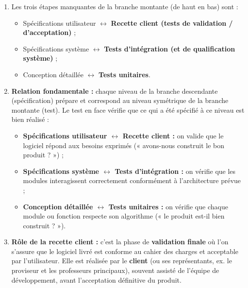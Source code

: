 \documentclass[11pt]{article}
\begin{document}
\begin{corrige}
\begin{enumerate}
    \item Les trois étapes manquantes de la branche montante (de haut en bas) sont :
    \begin{itemize}
        \item Spécifications utilisateur $\leftrightarrow$ \textbf{Recette client (tests de validation / d'acceptation)} ;
        \item Spécifications système $\leftrightarrow$ \textbf{Tests d'intégration (et de qualification système)} ;
        \item Conception détaillée $\leftrightarrow$ \textbf{Tests unitaires}.
    \end{itemize}
    \item \textbf{Relation fondamentale :} chaque niveau de la branche descendante (spécification) prépare et correspond au niveau symétrique de la branche montante (test). Le test en face vérifie que ce qui a été spécifié à ce niveau est bien réalisé :
    \begin{itemize}
        \item \textbf{Spécifications utilisateur $\leftrightarrow$ Recette client :} on valide que le logiciel répond aux besoins exprimés (« avons-nous construit le bon produit ? ») ;
        \item \textbf{Spécifications système $\leftrightarrow$ Tests d'intégration :} on vérifie que les modules interagissent correctement conformément à l'architecture prévue ;
        \item \textbf{Conception détaillée $\leftrightarrow$ Tests unitaires :} on vérifie que chaque module ou fonction respecte son algorithme (« le produit est-il bien construit ? »).
    \end{itemize}
    \item \textbf{Rôle de la recette client :} c'est la phase de \textbf{validation finale} où l'on s'assure que le logiciel livré est conforme au cahier des charges et acceptable par l'utilisateur. Elle est réalisée par le \textbf{client} (ou ses représentants, ex. le proviseur et les professeurs principaux), souvent assisté de l'équipe de développement, avant l'acceptation définitive du produit.
\end{enumerate}
\end{corrige}
\end{document}
